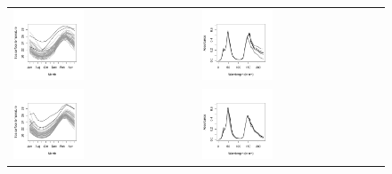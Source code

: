 \begin{figure}
\begin{center}
\begin{tabular}{ll}
\includegraphics[width=0.4\textwidth]{./Plots/Elnino_functional1} &
\includegraphics[width=0.4\textwidth]{./Plots/Octane_functional1}\\
\includegraphics[width=0.4\textwidth]{./Plots/Elnino_functional2} &
\includegraphics[width=0.4\textwidth]{./Plots/Octane_functional2}\\

\end{tabular}
\end{center}
\end{figure}
